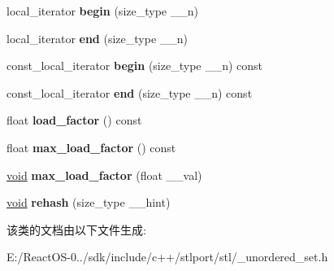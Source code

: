 \begin{DoxyCompactItemize}
local\+\_\+iterator {\bfseries begin} (size\+\_\+type \+\_\+\+\_\+n)
\item 
\mbox{\label{classunordered__set_af47769fc1ae52e1fe78654268f7060a3}} 
local\+\_\+iterator {\bfseries end} (size\+\_\+type \+\_\+\+\_\+n)
\item 
\mbox{\label{classunordered__set_a5bd9e77d74106083fd466420eea210df}} 
const\+\_\+local\+\_\+iterator {\bfseries begin} (size\+\_\+type \+\_\+\+\_\+n) const
\item 
\mbox{\label{classunordered__set_a7399e7471acfe710222e07c161db178d}} 
const\+\_\+local\+\_\+iterator {\bfseries end} (size\+\_\+type \+\_\+\+\_\+n) const
\item 
\mbox{\label{classunordered__set_a8f2f53138ad46a1a24c8a85ec6441dab}} 
float {\bfseries load\+\_\+factor} () const
\item 
\mbox{\label{classunordered__set_a1cfb04ecaf8330acdfe318984c71ab36}} 
float {\bfseries max\+\_\+load\+\_\+factor} () const
\item 
\mbox{\label{classunordered__set_a1989e1aa7309f27884c19aeda78bedf0}} 
\hyperlink{interfacevoid}{void} {\bfseries max\+\_\+load\+\_\+factor} (float \+\_\+\+\_\+val)
\item 
\mbox{\label{classunordered__set_ad26566a542149dda47e6291b73758e8d}} 
\hyperlink{interfacevoid}{void} {\bfseries rehash} (size\+\_\+type \+\_\+\+\_\+hint)
\end{DoxyCompactItemize}


该类的文档由以下文件生成\+:\begin{DoxyCompactItemize}
\item 
E\+:/\+React\+O\+S-\/0../sdk/include/c++/stlport/stl/\+\_\+unordered\+\_\+set.\+h\end{DoxyCompactItemize}
